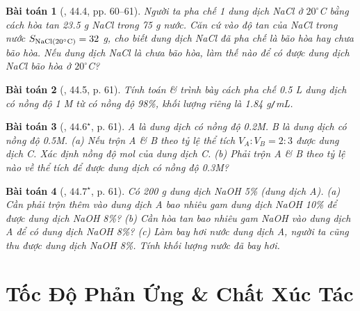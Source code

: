 \documentclass{article}
\newtheorem{baitoan}{Bài toán}
\begin{document}
\begin{baitoan}[\cite{SBT_Hoa_Hoc_8}, 44.4, pp. 60--61]
	Người ta pha chế 1 dung dịch \emph{NaCl} ở $20^\circ$\emph{C} bằng cách hòa tan \emph{23.5 g NaCl} trong \emph{75 g} nước. Căn cứ vào độ tan của \emph{NaCl} trong nước $S_{\rm NaCl(20^\circ C)} = 32$ \emph{g}, cho biết dung dịch \emph{NaCl} đã pha chế là bão hòa hay chưa bão hòa. Nếu dung dịch \emph{NaCl} là chưa bão hòa, làm thế nào để có được dung dịch \emph{NaCl} bão hòa ở $20^\circ$\emph{C}?
\end{baitoan}

\begin{baitoan}[\cite{SBT_Hoa_Hoc_8}, 44.5, p. 61]
	Tính toán \& trình bày cách pha chế \emph{0.5 L} dung dịch \emph{} có nồng độ \emph{1 M} từ \emph{} có nồng độ \emph{98\%}, khối lượng riêng là \emph{1.84 g\texttt{/}mL}.
\end{baitoan}

\begin{baitoan}[\cite{SBT_Hoa_Hoc_8}, $44.6^\star$, p. 61]
	A là dung dịch \emph{} có nồng độ \emph{0.2M}. B là dung dịch \emph{} có nồng độ \emph{0.5M}. (a) Nếu trộn A \& B theo tỷ lệ thể tích $V_A:V_B = 2:3$ được dung dịch C. Xác định nồng độ mol của dung dịch C. (b) Phải trộn A \& B theo tỷ lệ nào về thể tích để được dung dịch \emph{} có nồng độ \emph{0.3M}?
\end{baitoan}

\begin{baitoan}[\cite{SBT_Hoa_Hoc_8}, $44.7^\star$, p. 61]
	Có \emph{200 g} dung dịch \emph{NaOH 5\%} (dung dịch A). (a) Cần phải trộn thêm vào dung dịch A bao nhiêu gam dung dịch \emph{NaOH 10\%} để được dung dịch \emph{NaOH 8\%}? (b) Cần hòa tan bao nhiêu gam \emph{NaOH} vào dung dịch A để có dung dịch \emph{NaOH 8\%}? (c) Làm bay hơi nước dung dịch A, người ta cũng thu được dung dịch \emph{NaOH 8\%}. Tính khối lượng nước đã bay hơi.
\end{baitoan}


\section{Tốc Độ Phản Ứng \& Chất Xúc Tác}

\noindent{}


\printbibliography[heading=bibintoc]
	
\end{document}

